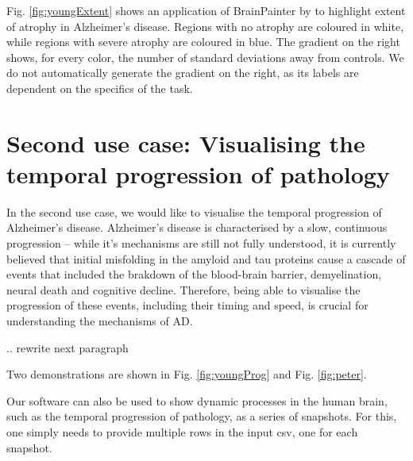 \documentclass{llncs}
\begin{document}
Fig. \ref{fig:youngExtent} shows an application of BrainPainter by \cite{young2018uncovering} to highlight extent of atrophy in Alzheimer's disease. Regions with no atrophy are coloured in white, while regions with severe atrophy are coloured in blue. The gradient on the right shows, for every color, the number of standard deviations away from controls. We do not automatically generate the gradient on the right, as its labels are dependent on the specifics of the task. 


\section{Second use case: Visualising the temporal progression of pathology}
\label{progression}

In the second use case, we would like to visualise the temporal progression of Alzheimer's disease. Alzheimer's disease is characterised by a slow, continuous progression -- while it's mechanisms are still not fully understood, it is currently believed that initial misfolding in the amyloid and tau proteins cause a cascade of events that included the brakdown of the blood-brain barrier, demyelination, neural death and cognitive decline. Therefore, being able to visualise the progression of these events, including their timing and speed, is crucial for understanding the mechanisms of AD. 

\TODOTODO .. rewrite next paragraph

Two demonstrations are shown in Fig. \ref{fig:youngProg} and Fig. \ref{fig:peter}.


Our software can also be used to show dynamic processes in the human brain, such as the temporal progression of pathology, as a series of snapshots. For this, one simply needs to provide multiple rows in the input csv, one for each snapshot. 
\end{document}
